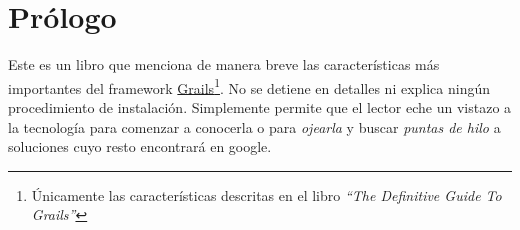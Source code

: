 \chapter{Pr\'ologo}
Este es un libro que menciona de manera breve las caracter\'isticas m\'as importantes del framework \href{``http://www.grails.org/''}{Grails}\footnote{\'Unicamente las caracter\'isticas descritas en el libro \textit{``The Definitive Guide To Grails''}}. No se detiene en detalles ni explica ning\'un procedimiento de instalaci\'on. Simplemente permite que el lector eche un vistazo a la tecnolog\'ia para comenzar a conocerla o para \textit{ojearla} y buscar \textit{puntas de hilo} a soluciones cuyo resto encontrar\'a en google.

